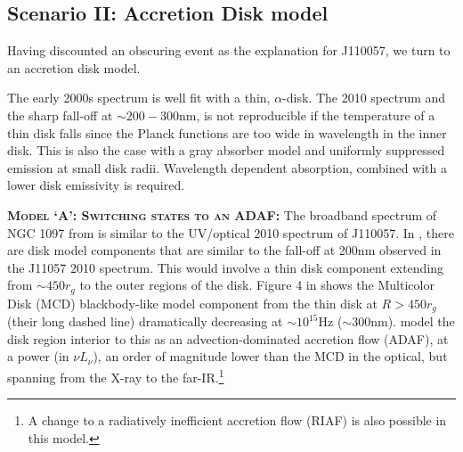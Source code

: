 \documentclass[11pt,a4paper]{article}
\begin{document}
\subsection*{Scenario II: Accretion Disk model}
Having discounted an obscuring event as the explanation for J110057,
we turn to an accretion disk model.

The early 2000s spectrum is well fit with a thin, \citet{SS73}
$\alpha$-disk. The 2010 spectrum and the sharp fall-off
at $\sim 200-300$nm, is not reproducible if the temperature of 
a thin disk falls since the Planck functions are too wide in
wavelength in the inner disk. This is also the case with a gray absorber
model and uniformly suppressed emission at small disk radii. 
Wavelength dependent absorption, combined with a lower
disk emissivity is required. 

\smallskip \smallskip
\noindent
\textbf{\textsc{Model `A': Switching states to an ADAF: }}
The broadband spectrum of NGC 1097 from \citet{Nemmen2006} is similar
to the UV/optical 2010 spectrum of J110057.  In \citet[][e.g., their
Figure 4]{Nemmen2006}, there are disk model components that are
similar to the fall-off at 200nm observed in the J11057 2010 spectrum.
This would involve a thin disk component extending from $\sim
450r_{g}$ to the outer regions of the disk. Figure 4 in
\citet{Nemmen2006} shows the Multicolor Disk (MCD) blackbody-like
model component from the thin disk at $R>450r_{g}$ (their long dashed
line) dramatically decreasing at $\sim 10^{15}$Hz ($\sim 300$nm).
\citet{Nemmen2006} model the disk region interior to this as 
an advection-dominated accretion flow (ADAF), at a power (in $\nu
L_{\nu}$), an order of magnitude lower than the MCD in the optical,
but spanning from the X-ray to the far-IR.\footnote{A change to 
a radiatively inefficient accretion flow (RIAF) is also possible in 
this model.}
\end{document}
